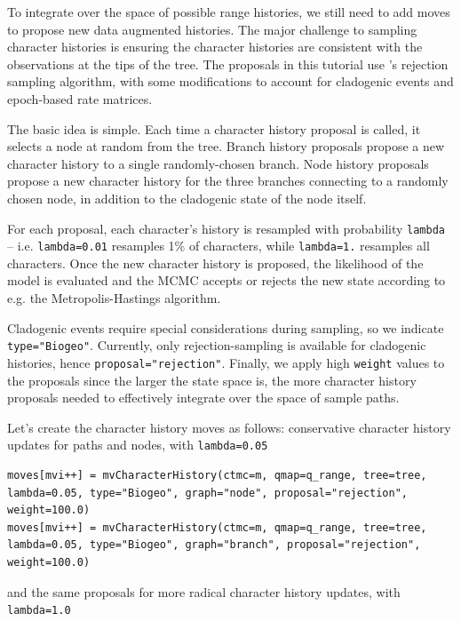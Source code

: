To integrate over the space of possible range histories, we still need to add moves to propose new data augmented histories.
The major challenge to sampling character histories is ensuring the character histories are consistent with the observations at the tips of the tree.
The proposals in this tutorial use \citet{nielsen02}'s rejection sampling algorithm, with some modifications to account for cladogenic events and epoch-based rate matrices.

The basic idea is simple.
Each time a character history proposal is called, it selects a node at random from the tree.
Branch history proposals propose a new character history to a single randomly-chosen branch.
Node history proposals propose a new character history for the three branches connecting to a randomly chosen node, in addition to the cladogenic state of the node itself.

For each proposal, each character's history is resampled with probability {\tt lambda} -- i.e. {\tt lambda=0.01} resamples 1\% of characters, while {\tt lambda=1.} resamples all characters.
Once the new character history is proposed, the likelihood of the model is evaluated and the MCMC accepts or rejects the new state according to e.g. the Metropolis-Hastings algorithm.

Cladogenic events require special considerations during sampling, so we indicate {\tt type="Biogeo"}.
Currently, only rejection-sampling is available for cladogenic histories, hence {\tt proposal="rejection"}. Finally, we apply high {\tt weight} values to the proposals since the larger the state space is, the more character history proposals needed to effectively integrate over the space of sample paths.

Let's create the character history moves as follows: conservative character history updates for paths and nodes, with {\tt lambda=0.05}

\begin{snugshade}
\begin{lstlisting}
moves[mvi++] = mvCharacterHistory(ctmc=m, qmap=q_range, tree=tree, lambda=0.05, type="Biogeo", graph="node", proposal="rejection", weight=100.0)
moves[mvi++] = mvCharacterHistory(ctmc=m, qmap=q_range, tree=tree, lambda=0.05, type="Biogeo", graph="branch", proposal="rejection", weight=100.0)
\end{lstlisting}
\end{snugshade}

and the same proposals for more radical character history updates, with {\tt lambda=1.0}

